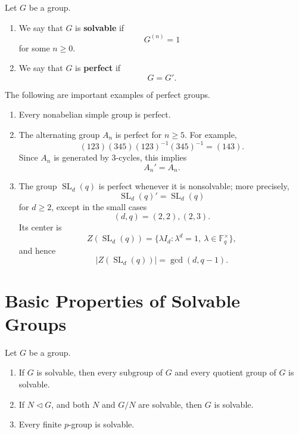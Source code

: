 \begin{definition}
Let \(G\) be a group.
\begin{enumerate}[label=(\arabic*)]
    \item We say that \(G\) is \textbf{solvable} if
    \[
        G^{(n)}=1
    \]
    for some \(n\geq 0\).

    \item We say that \(G\) is \textbf{perfect} if
    \[
        G=G'.
    \]
\end{enumerate}
\end{definition}

\begin{example}
The following are important examples of perfect groups.
\begin{enumerate}[label=(\arabic*)]
    \item Every nonabelian simple group is perfect.

    \item The alternating group \(A_n\) is perfect for \(n\geq 5\). For example,
    \[
        (123)(345)(123)^{-1}(345)^{-1}=(143).
    \]
    Since \(A_n\) is generated by \(3\)-cycles, this implies
    \[
        A_n'=A_n.
    \]

    \item The group \(\operatorname{SL}_d(q)\) is perfect whenever it is nonsolvable; more precisely,
    \[
        \operatorname{SL}_d(q)'=\operatorname{SL}_d(q)
    \]
    for \(d\geq 2\), except in the small cases
    \[
        (d,q)=(2,2),(2,3).
    \]
    Its center is
    \[
        Z(\operatorname{SL}_d(q))
        =
        \{\lambda I_d:\lambda^d=1,\ \lambda\in \mathbb F_q^\times\},
    \]
    and hence
    \[
        |Z(\operatorname{SL}_d(q))|
        =
        \gcd(d,q-1).
    \]
\end{enumerate}
\end{example}

\section{Basic Properties of Solvable Groups}

\begin{proposition}
Let \(G\) be a group.
\begin{enumerate}[label=(\arabic*)]
    \item If \(G\) is solvable, then every subgroup of \(G\) and every quotient group of \(G\) is solvable.

    \item If \(N\lhd G\), and both \(N\) and \(G/N\) are solvable, then \(G\) is solvable.

    \item Every finite \(p\)-group is solvable.
\end{enumerate}
\end{proposition}


